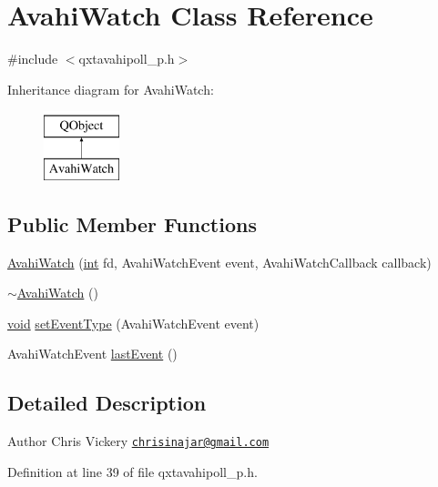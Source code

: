 \hypertarget{class_avahi_watch}{\section{Avahi\-Watch Class Reference}
\label{class_avahi_watch}
}


{\ttfamily \#include $<$qxtavahipoll\-\_\-p.\-h$>$}

Inheritance diagram for Avahi\-Watch\-:\begin{figure}[H]
\begin{center}
\leavevmode
\includegraphics[height=2.000000cm]{class_avahi_watch}
\end{center}
\end{figure}
\subsection*{Public Member Functions}
\begin{DoxyCompactItemize}
\item 
\hyperlink{class_avahi_watch_a94d385db441516225493da9a6b03ef9c}{Avahi\-Watch} (\hyperlink{ioapi_8h_a787fa3cf048117ba7123753c1e74fcd6}{int} fd, Avahi\-Watch\-Event event, Avahi\-Watch\-Callback callback)
\item 
\hyperlink{class_avahi_watch_a409b54224343a456f962166ffef03405}{$\sim$\-Avahi\-Watch} ()
\item 
\hyperlink{group___u_a_v_objects_plugin_ga444cf2ff3f0ecbe028adce838d373f5c}{void} \hyperlink{class_avahi_watch_ac8983edb292aa872dc92dd3d1e99a1d6}{set\-Event\-Type} (Avahi\-Watch\-Event event)
\item 
Avahi\-Watch\-Event \hyperlink{class_avahi_watch_a1478ca0694ba69b50413c95b14993b7e}{last\-Event} ()
\end{DoxyCompactItemize}


\subsection{Detailed Description}
\begin{DoxyAuthor}{Author}
Chris Vickery \href{mailto:chrisinajar@gmail.com}{\tt chrisinajar@gmail.\-com} 
\end{DoxyAuthor}


Definition at line 39 of file qxtavahipoll\-\_\-p.\-h.



